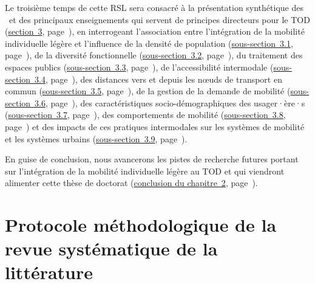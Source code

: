 \begin{refsegment}
Le troisième temps de cette \acrshort{RSL} sera consacré à la présentation synthétique des ~et des principaux enseignements qui servent de principes directeurs pour le TOD (\hyperref[chap2:caracterisation-btod-environnement-urbain-choix-individuels]{section~3}, page~\pageref{chap2:caracterisation-btod-environnement-urbain-choix-individuels}), en interrogeant l'association entre l'intégration de la mobilité individuelle légère et l'influence de la densité de population (\hyperref[chap2:densite-population]{sous-section~3.1}, page~\pageref{chap2:densite-population}), de la diversité fonctionnelle (\hyperref[chap2:diversite-fonctionnelle]{sous-section~3.2}, page~\pageref{chap2:diversite-fonctionnelle}), du traitement des espaces publics (\hyperref[chap2:traitement-espaces-publics]{sous-section~3.3}, page~\pageref{chap2:traitement-espaces-publics}), de l'accessibilité intermodale (\hyperref[chap2:accessibilite-intermodale]{sous-section~3.4}, page~\pageref{chap2:accessibilite-intermodale}), des distances vers et depuis les nœuds de transport en commun (\hyperref[chap2:distances-premiers-derniers-km]{sous-section~3.5}, page~\pageref{chap2:distances-premiers-derniers-km}), de la gestion de la demande de mobilité (\hyperref[chap2:gestion-demande-mobilite]{sous-section~3.6}, page~\pageref{chap2:gestion-demande-mobilite}), des caractéristiques socio-démographiques des usager·ère·s (\hyperref[chap2:sociodemographie-usagers]{sous-section~3.7}, page~\pageref{chap2:sociodemographie-usagers}), des comportements de mobilité (\hyperref[chap2:comportements-mobilite]{sous-section~3.8}, page~\pageref{chap2:comportements-mobilite}) et des impacts de ces pratiques intermodales sur les systèmes de mobilité et les systèmes urbains (\hyperref[chap2:impacts-systemes-urbain-mobilite]{sous-section~3.9}, page~\pageref{chap2:impacts-systemes-urbain-mobilite}).%

En guise de conclusion, nous avancerons les pistes de recherche futures portant sur l'intégration de la mobilité individuelle légère au \acrshort{TOD} et qui viendront alimenter cette thèse de doctorat (\hyperref[chap2:conclusion]{conclusion du chapitre~2}, page~\pageref{chap2:conclusion}).%

    \newpage
\section{Protocole méthodologique de la revue systématique de la littérature
    \label{chap2:protocole-methodologique-rsl}
    }
    

\end{refsegment}
